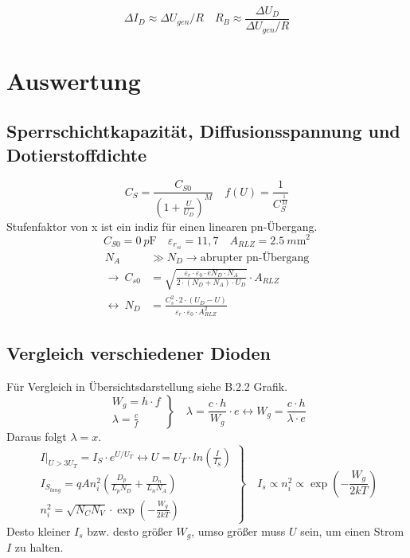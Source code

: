 \documentclass[
	a4paper, %
	12pt, %
]{CSUniSchoolLabReport}
\newcommand{\pico}{p}
\newcommand{\milli}{m}
\begin{document}
\[
\Delta I_D \approx \Delta U_{gen}/R \quad R_B \approx \frac{\Delta U_D}{\Delta U_{gen}/R}
\]
\section{Auswertung}
\subsection{Sperrschichtkapazität, Diffusionsspannung und \\Dotierstoffdichte}
\[
C_S = \frac{C_{S0}}{(1+\frac{U}{U_D})^M}\quad f(U) = \frac{1}{C_S^\frac{1}{M}}
\]
Stufenfaktor von x ist ein indiz für einen linearen pn-Übergang.
\[
C_{S0} = \SI{0}{\pico\farad} \quad \varepsilon _{r_{si}} = 11,7 \quad A_{RLZ} = \SI{2.5}{\milli\metre\squared}
\]
\begin{align*}
N_A &\gg N_D \rightarrow \text{abrupter pn-Übergang} \\
\rightarrow\ C_{s0} &= \sqrt{\frac{\varepsilon_r \cdot \varepsilon_0 \cdot e N_D \cdot N_A}{2 \cdot (N_D + N_A) \cdot U_D}} \cdot A_{RLZ} \\
\leftrightarrow\ N_D &= \frac{C_s^2 \cdot 2 \cdot (U_D - U)}{\varepsilon_r \cdot \varepsilon_0 \cdot A_{RLZ}^2}
\end{align*}


\subsection{Vergleich verschiedener Dioden}
Für Vergleich in Übersichtsdarstellung siehe B.2.2 Grafik.
\[
\left.
\begin{array}{l}
W_g = h \cdot f \\
\lambda = \frac{c}{f}
\end{array}
\right\}
\quad \lambda = \frac{c\cdot h}{W_g} \cdot e \leftrightarrow W_g = \frac{c \cdot h}{\lambda \cdot e}
\]
Daraus folgt $\lambda = x$. \\

\[
\left.
\begin{array}{l}
I|_{U>3U_T} = I_S\cdot e^{U/U_T} \leftrightarrow U = U_T\cdot ln(\frac{I}{I_S}) \\
I_{S_{lang}} = q A n_i^2 \left( \frac{D_p}{L_p N_D} + \frac{D_n}{L_n N_A} \right) \\
n_i^2 = \sqrt{N_C N_V} \cdot \exp\left(-\frac{W_g}{2kT}\right)
\end{array}
\right\}
\quad I_s \varpropto n_i^2 \varpropto \exp\left(-\frac{W_g}{2kT}\right)
\]
Desto kleiner $I_s$ bzw. desto größer $W_g$, umso größer muss $U$ sein, um einen Strom $I$ zu halten.  
\end{document}
